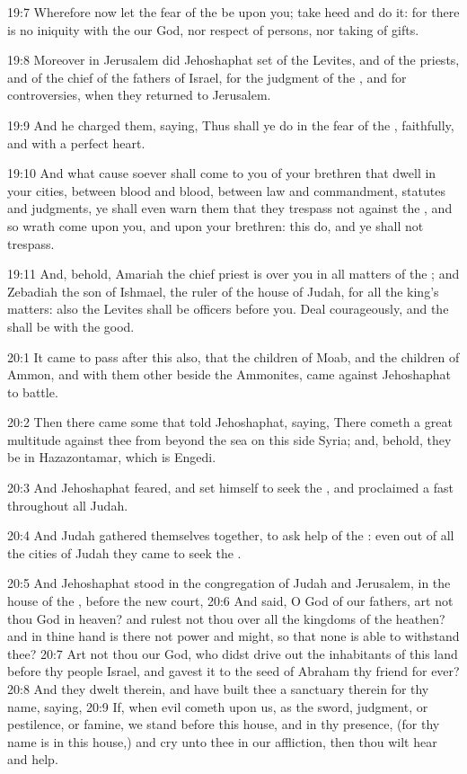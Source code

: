 19:7 Wherefore now let the fear of the \LORD be upon you; take heed and do it: for there is no iniquity with the \LORD our God, nor respect of persons, nor taking of gifts.

19:8 Moreover in Jerusalem did Jehoshaphat set of the Levites, and of the priests, and of the chief of the fathers of Israel, for the judgment of the \LORD, and for controversies, when they returned to Jerusalem.

19:9 And he charged them, saying, Thus shall ye do in the fear of the \LORD, faithfully, and with a perfect heart.

19:10 And what cause soever shall come to you of your brethren that dwell in your cities, between blood and blood, between law and commandment, statutes and judgments, ye shall even warn them that they trespass not against the \LORD, and so wrath come upon you, and upon your brethren: this do, and ye shall not trespass.

19:11 And, behold, Amariah the chief priest is over you in all matters of the \LORD; and Zebadiah the son of Ishmael, the ruler of the house of Judah, for all the king's matters: also the Levites shall be officers before you. Deal courageously, and the \LORD shall be with the good.

20:1 It came to pass after this also, that the children of Moab, and the children of Ammon, and with them other beside the Ammonites, came against Jehoshaphat to battle.

20:2 Then there came some that told Jehoshaphat, saying, There cometh a great multitude against thee from beyond the sea on this side Syria; and, behold, they be in Hazazontamar, which is Engedi.

20:3 And Jehoshaphat feared, and set himself to seek the \LORD, and proclaimed a fast throughout all Judah.

20:4 And Judah gathered themselves together, to ask help of the \LORD: even out of all the cities of Judah they came to seek the \LORD.

20:5 And Jehoshaphat stood in the congregation of Judah and Jerusalem, in the house of the \LORD, before the new court, 20:6 And said, O \LORD God of our fathers, art not thou God in heaven? and rulest not thou over all the kingdoms of the heathen? and in thine hand is there not power and might, so that none is able to withstand thee?  20:7 Art not thou our God, who didst drive out the inhabitants of this land before thy people Israel, and gavest it to the seed of Abraham thy friend for ever?  20:8 And they dwelt therein, and have built thee a sanctuary therein for thy name, saying, 20:9 If, when evil cometh upon us, as the sword, judgment, or pestilence, or famine, we stand before this house, and in thy presence, (for thy name is in this house,) and cry unto thee in our affliction, then thou wilt hear and help.

